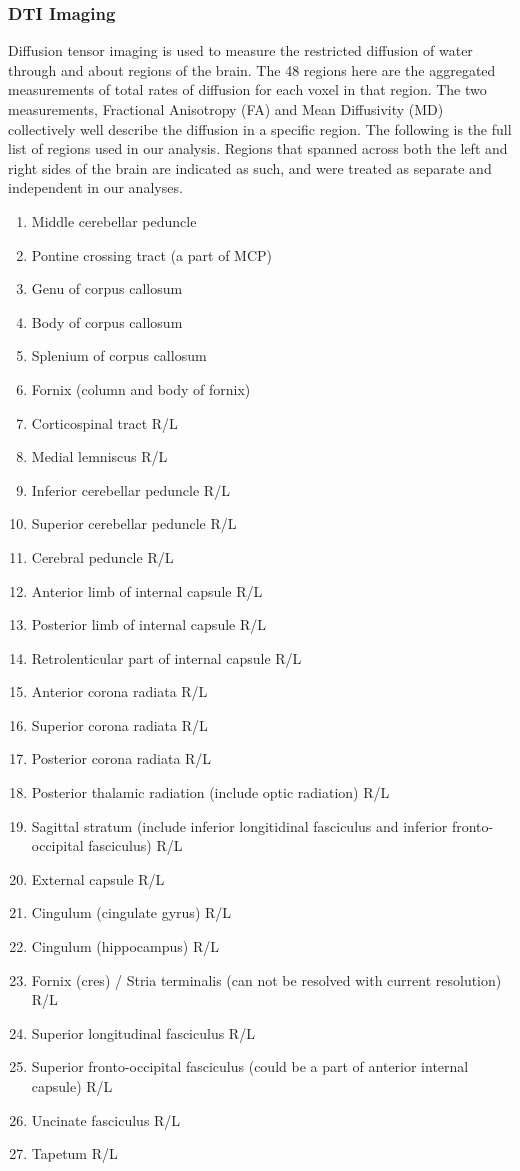 \subsubsection*{DTI Imaging}
Diffusion tensor imaging is used to measure the restricted diffusion of water through and about regions of the brain. The 48 regions here are the aggregated measurements of total rates of diffusion for each voxel in that region. The two measurements, Fractional Anisotropy (FA) and Mean Diffusivity (MD) collectively well describe the diffusion in a specific region. The following is the full list of regions used in our analysis. Regions that spanned across both the left and right sides of the brain are indicated as such, and were treated as separate and independent in our analyses. 
{\small
\begin{multicols}{2}
\begin{enumerate}
\item Middle cerebellar peduncle
\item Pontine crossing tract (a part of MCP)
\item Genu of corpus callosum
\item Body of corpus callosum
\item Splenium of corpus callosum
\item Fornix (column and body of fornix)
\item Corticospinal tract R/L
\item Medial lemniscus R/L
\item Inferior cerebellar peduncle R/L
\item Superior cerebellar peduncle R/L
\item Cerebral peduncle R/L
\item Anterior limb of internal capsule R/L
\item Posterior limb of internal capsule R/L
\item Retrolenticular part of internal capsule R/L
\item Anterior corona radiata R/L
\item Superior corona radiata R/L
\item Posterior corona radiata R/L
\item Posterior thalamic radiation (include optic radiation) R/L
\item Sagittal stratum (include inferior longitidinal fasciculus and inferior fronto-occipital fasciculus) R/L
\item External capsule R/L
\item Cingulum (cingulate gyrus) R/L
\item Cingulum (hippocampus) R/L
\item Fornix (cres) / Stria terminalis (can not be resolved with current resolution) R/L
\item Superior longitudinal fasciculus R/L
\item Superior fronto-occipital fasciculus (could be a part of anterior internal capsule) R/L
\item Uncinate fasciculus R/L
\item Tapetum R/L
\end{enumerate}
\end{multicols}
}
